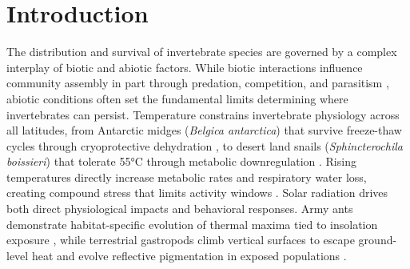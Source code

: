 \section{Introduction}
\label{ch:introduction}

The distribution and survival of invertebrate species are governed by a complex interplay of biotic and abiotic factors. While biotic interactions influence community assembly in part through predation, competition, and parasitism \parencite{blois-heulinDirectIndirectEffects1990,laffertyComparingMechanismsHost2013,miller-terkuilePredatorPreyInteractions2022}, abiotic conditions often set the fundamental limits determining where invertebrates can persist. Temperature constrains invertebrate physiology across all latitudes, from Antarctic midges (\textit{Belgica antarctica}) that survive freeze-thaw cycles through cryoprotective dehydration \parencite{everattResponsesInvertebratesTemperature2015}, to desert land snails (\textit{Sphincterochila boissieri}) that tolerate 55°C through metabolic downregulation \parencite{schweizerSnailsSunStrategies2019}. Rising temperatures directly increase metabolic rates and respiratory water loss, creating compound stress that limits activity windows \parencite{chownWaterLossInsects2011}. Solar radiation drives both direct physiological impacts and behavioral responses. Army ants demonstrate habitat-specific evolution of thermal maxima tied to insolation exposure \parencite{baudierExtremeInsolationClimatic2018}, while terrestrial gastropods climb vertical surfaces to escape ground-level heat and evolve reflective pigmentation in exposed populations \parencite{schweizerSnailsSunStrategies2019}.

